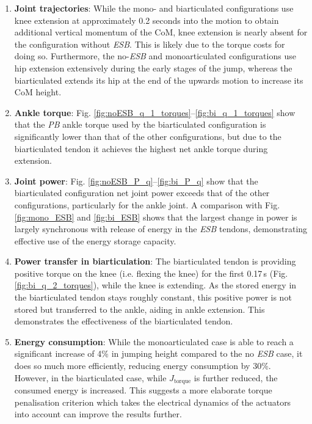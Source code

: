 \documentclass[letterpaper, 10 pt, conference]{ieeeconf}  %
\begin{document}
\begin{enumerate}
	\item \textbf{Joint trajectories}: While the mono- and biarticulated configurations use knee extension at approximately 0.2 seconds into the motion to obtain additional vertical momentum of the CoM, knee extension is nearly absent for the configuration without \textit{ESB}. This is likely due to the torque costs for doing so. Furthermore, the no-\textit{ESB} and monoarticulated configurations use hip extension extensively during the early stages of the jump, whereas the biarticulated extends its hip at the end of the upwards motion to increase its CoM height.

	\item \textbf{Ankle torque}: Fig. \ref{fig:noESB_q_1_torques}--\ref{fig:bi_q_1_torques} show that the \textit{PB} ankle torque used by the biarticulated configuration is significantly lower than that of the other configurations, but due to the biarticulated tendon it achieves the highest net ankle torque during extension.
	
	\item \textbf{Joint power}: Fig. \ref{fig:noESB_P_q}--\ref{fig:bi_P_q} show that the biarticulated configuration net joint power exceeds that of the other configurations, particularly for the ankle joint. A comparison with Fig. \ref{fig:mono_ESB} and \ref{fig:bi_ESB} shows that the largest change in power is largely synchronous with release of energy in the \textit{ESB} tendons, demonstrating effective use of the energy storage capacity.
	
	\item \textbf{Power transfer in biarticulation}: The biarticulated tendon is providing positive torque on the knee (i.e. flexing the knee) for the first 0.17\,s (Fig. \ref{fig:bi_q_2_torques}), while the knee is extending. As the stored energy in the biarticulated tendon stays roughly constant, this positive power is not stored but transferred to the ankle, aiding in ankle extension. This demonstrates the effectiveness of the biarticulated tendon.
	
	\item \textbf{Energy consumption}: While the monoarticulated case is able to reach a significant increase of 4\% in jumping height compared to the no \textit{ESB} case, it does so much more efficiently, reducing energy consumption by 30\%. However, in the biarticulated case, while $J_{\text{torque}}$ is further reduced, the consumed energy is increased. This suggests a more elaborate torque penalisation criterion which takes the electrical dynamics of the actuators into account can improve the results further.
\end{enumerate}
\end{document}
